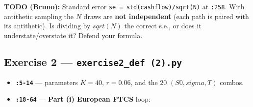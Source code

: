 \documentclass[
  11pt,
]{article}
\providecommand{\tightlist}{%
  \setlength{\itemsep}{0pt}\setlength{\parskip}{0pt}}
\begin{document}
\textbf{TODO (Bruno):} Standard error
\texttt{se\ =\ std(cashflow)/sqrt(N)} at \texttt{:258}. With antithetic
sampling the \(N\) draws are \textbf{not independent} (each path is
paired with its antithetic). Is dividing by \(sqrt(N)\) the correct
s.e., or does it understate/overstate it? Defend your formula.

\hypertarget{exercise-2-exercise2_def-2.py}{%
\subsection{\texorpdfstring{Exercise 2 ---
\texttt{exercise2\_def\ (2).py}}{Exercise 2 --- exercise2\_def (2).py}}\label{exercise-2-exercise2_def-2.py}}

\begin{itemize}
\tightlist
\item
  \textbf{\texttt{:5-14}} --- parameters \(K=40\), \(r=0.06\), and the
  20 \((S0, sigma, T)\) combos.
\item
  \textbf{\texttt{:18-64}} --- \textbf{Part (i) European FTCS} loop:


\end{itemize}
\end{document}
